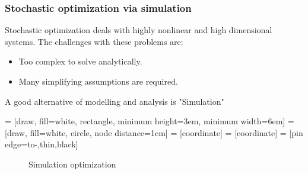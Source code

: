 \begin{frame}
\frametitle{\centering  Stochastic optimization via simulation}
\begin{small}
\begin{block}{}
Stochastic optimization deals with  highly nonlinear and high dimensional systems. The challenges with these problems are:
\begin{itemize}
\item Too complex to solve analytically.
\item Many simplifying assumptions are  required.
\end{itemize}
\end{block}
\pause
\begin{block}{}
A good alternative of modelling and analysis is \alert{"Simulation"}
\end{block}

\begin{block}{}
 = [draw, fill=white, rectangle,
   minimum height=3em, minimum width=6em]
 = [draw, fill=white, circle, node distance=1cm]
 = [coordinate]
 = [coordinate]
 = [pin edge={to-,thin,black}]

 \begin{figure}[t]
    \centering
{}
\caption{Simulation optimization}
\label{fig:so}
\end{figure}

\end{block}
\end{small}
\end{frame}




